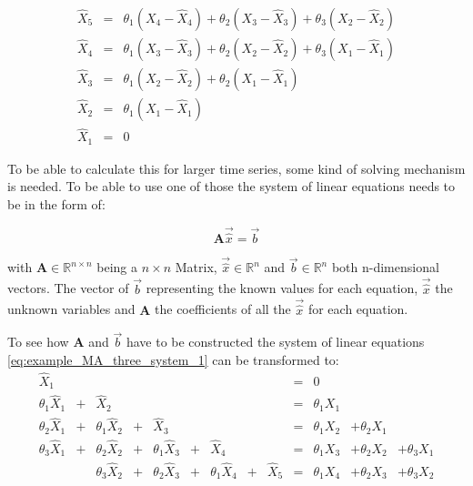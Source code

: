 \begin{equation}\label{eq:example_MA_three_system_1}
\begin{array}{lcl}
{\hat{X}}_{5} & = & \theta_1 (X_{4} - {\hat{X}}_{4}) + \theta_2 (X_{3} - {\hat{X}}_{3}) + \theta_3 (X_{2} - {\hat{X}}_{2}) \\
{\hat{X}}_{4} & = & \theta_1 (X_{3} - {\hat{X}}_{3}) + \theta_2 (X_{2} - {\hat{X}}_{2}) + \theta_3 (X_{1} - {\hat{X}}_{1}) \\
{\hat{X}}_{3} & = & \theta_1 (X_{2} - {\hat{X}}_{2}) + \theta_2 (X_{1} - {\hat{X}}_{1})\\
{\hat{X}}_{2} & = & \theta_1 (X_{1} - {\hat{X}}_{1})\\
{\hat{X}}_{1} & = & 0
\end{array}
\end{equation}

To be able to calculate this for larger time series, some kind of solving mechanism is needed. To be able to use one of those the system of linear equations needs to be in the form of:

\begin{equation}\label{eq:syslinequation}
\mathbf{A}  \vec{\hat{x}} = \vec{b}
\end{equation}

with $\mathbf{A} \in \mathbb{R}^{n\times n}$ being a $n\times n$ Matrix,  $\vec{\hat{x}} \in \mathbb{R}^n$ and  $\vec{b}\in \mathbb{R}^n$ both n-dimensional vectors. The vector of $\vec{b}$ representing the known values for each equation, $\vec{\hat{x}}$ the unknown variables and $\mathbf{A}$ the coefficients of all the $\vec{\hat{x}}$ for each equation.

To see how $\mathbf{A}$ and  $\vec{b}$ have to be constructed the system of linear equations \eqref{eq:example_MA_three_system_1} can be transformed to:
\begin{equation}\label{eq:example_MA_three_system_2}
\begin{array}{rcrcrcrcrclll}
{\hat{X}}_{1}&&&&&&&&& = &0&&\\
\theta_1 {\hat{X}}_{1} &+& {\hat{X}}_{2} & & & & & & &= &\theta_1 X_{1}&&\\
\theta_2 {\hat{X}}_{1}&+&\theta_1 {\hat{X}}_{2} &+& {\hat{X}}_{3}&  &  &&& = &\theta_1 X_{2} &+ \theta_2 X_{1}&\\
\theta_3 {\hat{X}}_{1} &+& \theta_2 {\hat{X}}_{2} &+&  \theta_1 {\hat{X}}_{3}&+& {\hat{X}}_{4}& && = &\theta_1 X_{3} &+ \theta_2 X_{2} &+ \theta_3 X_{1}\\ 	
&&\theta_3 {\hat{X}}_{2} &+& \theta_2 {\hat{X}}_{3}&+& \theta_1 {\hat{X}}_{4} &+&{\hat{X}}_{5}& = &  \theta_1 X_{4} &+\theta_2 X_{3} &+ \theta_3 X_{2}
\end{array}
\end{equation}

